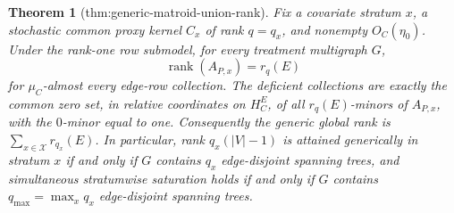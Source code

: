 \documentclass{article}
\newtheorem{theorem}{Theorem}
\begin{document}
\begin{theorem}[thm:generic-matroid-union-rank]\label{thm:generic-matroid-union-rank}
Fix a covariate stratum \(x\), a stochastic common proxy kernel \(C_x\) of rank \(q=q_x\), and nonempty \(O_C(\eta_0)\).  Under the rank-one row submodel, for every treatment multigraph \(G\),
\[
\operatorname{rank}(A_{P,x})=r_q(E)
\]
for \(\mu_C\)-almost every edge-row collection.  The deficient collections are exactly the common zero set, in relative coordinates on \(H_C^E\), of all \(r_q(E)\)-minors of \(A_{P,x}\), with the \(0\)-minor equal to one.  Consequently the generic global rank is \(\sum_{x\in\mathcal X}r_{q_x}(E)\).  In particular, rank \(q_x(|V|-1)\) is attained generically in stratum \(x\) if and only if \(G\) contains \(q_x\) edge-disjoint spanning trees, and simultaneous stratumwise saturation holds if and only if \(G\) contains \(q_{\max}=\max_xq_x\) edge-disjoint spanning trees.
\end{theorem}
\end{document}
